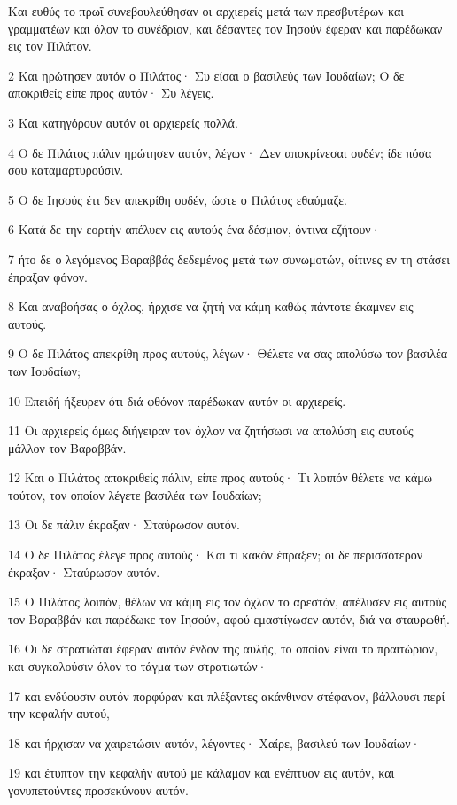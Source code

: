 \par Και ευθύς το πρωΐ συνεβουλεύθησαν οι αρχιερείς μετά των πρεσβυτέρων και γραμματέων και όλον το συνέδριον, και δέσαντες τον Ιησούν έφεραν και παρέδωκαν εις τον Πιλάτον.
\par 2 Και ηρώτησεν αυτόν ο Πιλάτος· Συ είσαι ο βασιλεύς των Ιουδαίων; Ο δε αποκριθείς είπε προς αυτόν· Συ λέγεις.
\par 3 Και κατηγόρουν αυτόν οι αρχιερείς πολλά.
\par 4 Ο δε Πιλάτος πάλιν ηρώτησεν αυτόν, λέγων· Δεν αποκρίνεσαι ουδέν; ίδε πόσα σου καταμαρτυρούσιν.
\par 5 Ο δε Ιησούς έτι δεν απεκρίθη ουδέν, ώστε ο Πιλάτος εθαύμαζε.
\par 6 Κατά δε την εορτήν απέλυεν εις αυτούς ένα δέσμιον, όντινα εζήτουν·
\par 7 ήτο δε ο λεγόμενος Βαραββάς δεδεμένος μετά των συνωμοτών, οίτινες εν τη στάσει έπραξαν φόνον.
\par 8 Και αναβοήσας ο όχλος, ήρχισε να ζητή να κάμη καθώς πάντοτε έκαμνεν εις αυτούς.
\par 9 Ο δε Πιλάτος απεκρίθη προς αυτούς, λέγων· Θέλετε να σας απολύσω τον βασιλέα των Ιουδαίων;
\par 10 Επειδή ήξευρεν ότι διά φθόνον παρέδωκαν αυτόν οι αρχιερείς.
\par 11 Οι αρχιερείς όμως διήγειραν τον όχλον να ζητήσωσι να απολύση εις αυτούς μάλλον τον Βαραββάν.
\par 12 Και ο Πιλάτος αποκριθείς πάλιν, είπε προς αυτούς· Τι λοιπόν θέλετε να κάμω τούτον, τον οποίον λέγετε βασιλέα των Ιουδαίων;
\par 13 Οι δε πάλιν έκραξαν· Σταύρωσον αυτόν.
\par 14 Ο δε Πιλάτος έλεγε προς αυτούς· Και τι κακόν έπραξεν; οι δε περισσότερον έκραξαν· Σταύρωσον αυτόν.
\par 15 Ο Πιλάτος λοιπόν, θέλων να κάμη εις τον όχλον το αρεστόν, απέλυσεν εις αυτούς τον Βαραββάν και παρέδωκε τον Ιησούν, αφού εμαστίγωσεν αυτόν, διά να σταυρωθή.
\par 16 Οι δε στρατιώται έφεραν αυτόν ένδον της αυλής, το οποίον είναι το πραιτώριον, και συγκαλούσιν όλον το τάγμα των στρατιωτών·
\par 17 και ενδύουσιν αυτόν πορφύραν και πλέξαντες ακάνθινον στέφανον, βάλλουσι περί την κεφαλήν αυτού,
\par 18 και ήρχισαν να χαιρετώσιν αυτόν, λέγοντες· Χαίρε, βασιλεύ των Ιουδαίων·
\par 19 και έτυπτον την κεφαλήν αυτού με κάλαμον και ενέπτυον εις αυτόν, και γονυπετούντες προσεκύνουν αυτόν.
